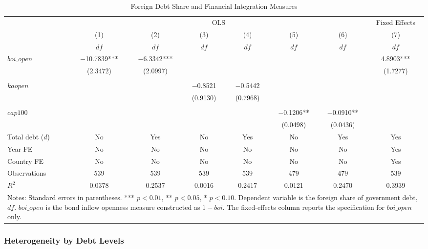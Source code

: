 \documentclass[\latexroot/\projectname]{subfiles}
\begin{document}
\begin{table}[htbp]
\centering
\caption{Foreign Debt Share and Financial Integration Measures}
\label{tab:df_financial_integration}
\begin{tabular}{lccccccc}
\toprule
& \multicolumn{6}{c}{OLS} & \multicolumn{1}{c}{Fixed Effects} \\
\cmidrule(lr){2-7} \cmidrule(lr){8-8}
& (1) & (2) & (3) & (4) & (5) & (6) & (7) \\
& $df$ & $df$ & $df$ & $df$ & $df$ & $df$ & $df$ \\
\midrule
$boi\_open$ 
    & $-$10.7839*** & $-$6.3342*** &            &            &            &            & 4.8903*** \\
    & (2.3472)    & (2.0997)   &            &            &            &            & (1.7277) \\
\\
$kaopen$
    &            &            & $-$0.8521    & $-$0.5442    &            &            &          \\
    &            &            & (0.9130)   & (0.7968)   &            &            &          \\
\\
$cap100$
    &            &            &            &            & $-$0.1206**  & $-$0.0910**  &          \\
    &            &            &            &            & (0.0498)   & (0.0436)   &          \\
\midrule
Total debt ($d$)
    & No & Yes & No & Yes & No & Yes & Yes \\
Year FE
    & No & No & No & No & No & No & Yes \\
Country FE
    & No & No & No & No & No & No & Yes \\
Observations
    & 539 & 539 & 539 & 539 & 479 & 479 & 539 \\
$R^2$
    & 0.0378 & 0.2537 & 0.0016 & 0.2417 & 0.0121 & 0.2470 & 0.3939 \\
\bottomrule
\multicolumn{8}{p{0.92\linewidth}}{\footnotesize Notes: Standard errors in parentheses. *** $p<0.01$, ** $p<0.05$, * $p<0.10$. Dependent variable is the foreign share of government debt, $df$. $boi\_open$ is the bond inflow openness measure constructed as $1-boi$. The fixed-effects column reports the specification for $boi\_open$ only.}
\end{tabular}
\end{table}

\subsubsection{Heterogeneity by Debt Levels}
\end{document}
